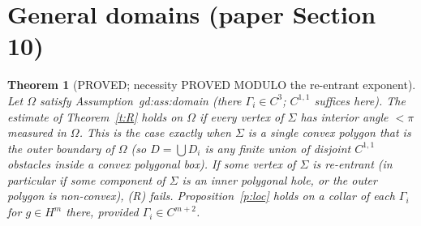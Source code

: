 \documentclass[11pt,reqno]{amsart}
\theoremstyle{plain}
\newtheorem{theorem}{Theorem}[section]
\theoremstyle{definition}
\begin{document}
\section{General domains (paper Section 10)}\label{s:gd}

\begin{theorem}[PROVED; necessity PROVED MODULO the re-entrant exponent]\label{t:gd}
Let $\Omega$ satisfy Assumption~gd:ass:domain (there $\Gamma_i\in C^3$; $C^{1,1}$ suffices here). The estimate of Theorem~\ref{t:R} holds on $\Omega$ if every vertex of $\Sigma$ has interior angle $<\pi$ measured in $\Omega$. This is the case exactly when $\Sigma$ is a single convex polygon that is the outer boundary of $\Omega$ (so $D=\bigcup D_i$ is any finite union of disjoint $C^{1,1}$ obstacles inside a convex polygonal box). If some vertex of $\Sigma$ is re-entrant (in particular if some component of $\Sigma$ is an inner polygonal hole, or the outer polygon is non-convex), (R) fails. Proposition~\ref{p:loc} holds on a collar of each $\Gamma_i$ for $g\in H^m$ there, provided $\Gamma_i\in C^{m+2}$.
\end{theorem}
\end{document}
